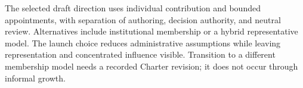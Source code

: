 \documentclass[11pt,a4paper]{article}
\begin{document}
The selected draft direction uses individual contribution and bounded appointments, with separation of authoring, decision authority, and neutral review. Alternatives include institutional membership or a hybrid representative model. The launch choice reduces administrative assumptions while leaving representation and concentrated influence visible. Transition to a different membership model needs a recorded Charter revision; it does not occur through informal growth.

\end{document}
